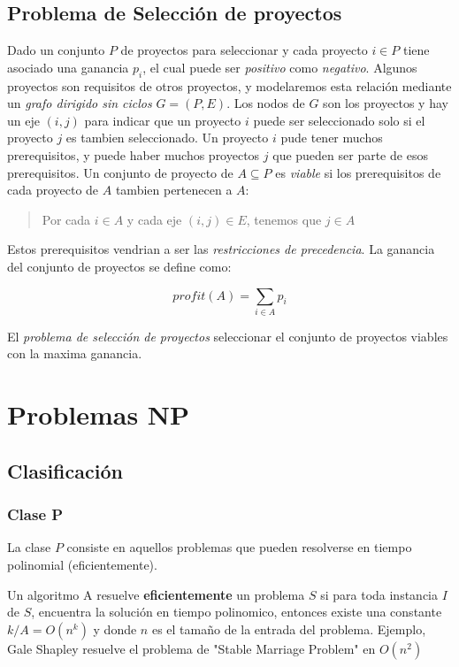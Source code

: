 \documentclass{article}
\begin{document}
\newpage
\subsection{Problema de Selección de proyectos}

Dado un conjunto \(P\) de proyectos para seleccionar y cada proyecto \(i \in P\) tiene
asociado una ganancia \(p_i\), el cual puede ser \textit{positivo} como \textit{negativo}.
Algunos proyectos son requisitos de otros proyectos, y modelaremos esta relación mediante un \textit{grafo
dirigido sin ciclos} \(G=(P,E)\). Los nodos de \(G\) son los proyectos y hay un eje \((i,j)\) para indicar
que un proyecto \(i\) puede ser seleccionado solo si el proyecto \(j\) es tambien seleccionado.
Un proyecto \(i\) pude tener muchos prerequisitos, y puede haber muchos proyectos \(j\) que pueden
ser parte de esos prerequisitos. Un conjunto de proyecto de \(A \subseteq P\) es \textit{viable} si los 
prerequisitos de cada proyecto de \(A\) tambien pertenecen a \(A\):
\begin{quote}
    Por cada \(i \in A\) y cada eje \((i,j) \in E\), tenemos que \(j \in A\)
\end{quote}
Estos prerequisitos vendrian a ser las \textit{restricciones de precedencia}. La ganancia del conjunto de proyectos
se define como:

\[
    profit(A) = \sum_{i\in A} p_i 
\]

El \textit{problema de selección de proyectos} seleccionar el conjunto de proyectos viables con la maxima ganancia.


\newpage
\section{Problemas NP}

\subsection{Clasificación}

\subsubsection{Clase P}

La clase \(P\) consiste en aquellos problemas que pueden resolverse en tiempo polinomial (eficientemente).

Un algoritmo A resuelve \textbf{eficientemente} un problema \(S\) si para toda instancia \(I\) de \(S\),
encuentra la solución en tiempo polinomico, entonces existe una constante \(k / A = O(n^k)\) 
y donde \(n\) es el tamaño de la entrada del problema. 
Ejemplo, Gale Shapley resuelve el problema de "Stable Marriage Problem" en \(O(n^2)\)
\end{document}

